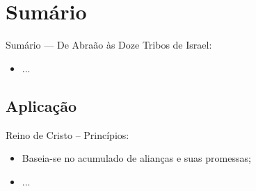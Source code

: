 \documentclass[12pt,aspectratio=169]{beamer}
\newcommand{\ORA}[1]{{\textcolor{TXred!50!TXyel}{#1}}}
\newcommand{\YEL}[1]{{\textcolor{TXyel}{#1}}}
\newcommand{\GRE}[1]{{\textcolor{TXgre}{#1}}}
\begin{document}
\section{Sumário}

    \begin{frame}
        \par\noindent\hspace*{0.05\linewidth}%
        \begin{minipage}{0.9\linewidth}%
            \large%
            \begin{alertblock}{Sumário --- De Abraão às Doze Tribos de Israel:}
                \normalsize
                \begin{itemize}
					\item<1-> ...
                \end{itemize}
            \end{alertblock}
        \end{minipage}%
    \end{frame}

    \subsection{Aplicação}

    \begin{frame}{\YEL{Reino de Cristo} -- Princípios:}
        \begin{itemize}
            \item<1-> Baseia-se no \YEL{acumulado} de \GRE{alianças} e suas \ORA{promessas};
            \item<1-> ...
        \end{itemize}
    \end{frame}

\end{document}

